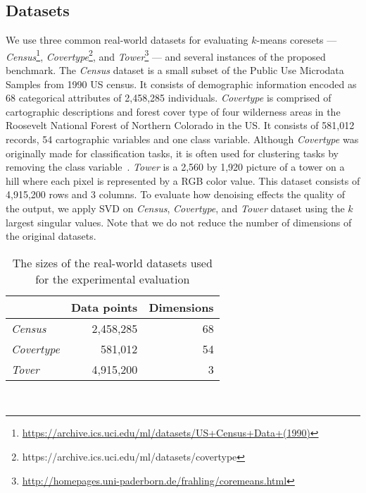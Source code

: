 \subsection{Datasets}
We use three common real-world datasets for evaluating $k$-means coresets 
---
\textit{Census}\footnote{\url{https://archive.ics.uci.edu/ml/datasets/US+Census+Data+(1990)}},
\textit{Covertype}\footnote{https://archive.ics.uci.edu/ml/datasets/covertype}, and 
\textit{Tower}\footnote{\url{http://homepages.uni-paderborn.de/frahling/coremeans.html}}
---
and several instances of the proposed benchmark. 
The \textit{Census} dataset is a small subset of the Public Use Microdata Samples from 1990 US census. It consists of demographic information encoded as 68 categorical attributes of 2,458,285 individuals. \textit{Covertype} is comprised of cartographic descriptions and forest cover type of four wilderness areas in the Roosevelt National Forest of Northern Colorado in the US. It consists of 581,012 records, 54 cartographic variables and one class variable. Although \textit{Covertype} was originally made for classification tasks, it is often used for clustering tasks by removing the class variable~\cite{ackermann2012streamkmpp}. \textit{Tower} is a 2,560 by 1,920 picture of a tower on a hill where each pixel is represented by a RGB color value. This dataset consists of 4,915,200 rows and 3 columns. To evaluate how denoising effects the quality of the output, we apply SVD on \textit{Census}, \textit{Covertype}, and \textit{Tower} dataset using the $k$ largest singular values. Note that we do not reduce the number of dimensions of the original datasets. 


%
\begin{table}
	\begin{center}%
	\caption{The sizes of the real-world datasets used for the experimental evaluation}
	\label{tab:real-world-datasets-overview}
	\begin{tabular}{lrr}
		\toprule
        
		    & Data points
		    & Dimensions
            \\
		\midrule
		\textit{Census}
    		& 2,458,285
    		& 68
    		\\
	    \textit{Covertype}
    	    & 581,012
    		& 54
    		\\
        \textit{Tover}
            & 4,915,200
    		& 3
    		\\
		\bottomrule
	\end{tabular}\\
	\end{center}
\end{table}

